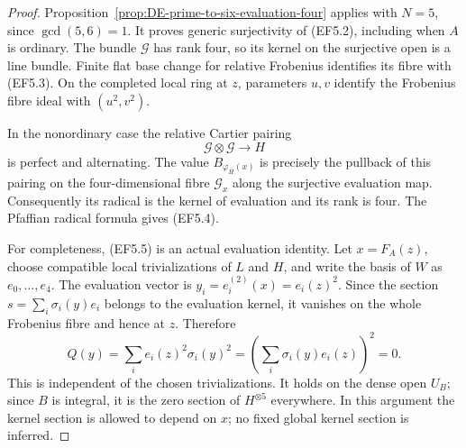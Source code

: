 \begin{proof}
Proposition~\ref{prop:DE-prime-to-six-evaluation-four} applies
with \(N=5\), since \(\gcd(5,6)=1\). It proves generic
surjectivity of (EF5.2), including when \(A\) is ordinary.
The bundle \(\mathcal G\) has rank four, so its kernel on the
surjective open is a line bundle. Finite flat base change for
relative Frobenius identifies its fibre with (EF5.3).
On the completed local ring at \(z\), parameters \(u,v\)
identify the Frobenius fibre ideal with \((u^2,v^2)\).

In the nonordinary case the relative Cartier pairing
\[
                  \mathcal G\otimes\mathcal G\longrightarrow H
 \tag{EF5.6}
\]
is perfect and alternating. The value \(B_{\varphi_H(x)}\)
is precisely the pullback of this pairing on the four-dimensional
fibre \(\mathcal G_x\) along the surjective evaluation map.
Consequently its radical is the kernel of evaluation and its
rank is four. The Pfaffian radical formula gives (EF5.4).

For completeness, (EF5.5) is an actual evaluation identity.
Let \(x=F_A(z)\), choose compatible local trivializations of
\(L\) and \(H\), and write the basis of \(W\) as
\(e_0,\ldots,e_4\). The evaluation vector is
\(y_i=e_i^{(2)}(x)=e_i(z)^2\). Since the section
\(s=\sum_i\sigma_i(y)e_i\) belongs to the evaluation kernel,
it vanishes on the whole Frobenius fibre and hence at \(z\).
Therefore
\[
 Q(y)=\sum_i e_i(z)^2\sigma_i(y)^2
       =\left(\sum_i\sigma_i(y)e_i(z)\right)^2=0.
 \tag{EF5.7}
\]
This is independent of the chosen trivializations. It holds on
the dense open \(U_B\); since \(B\) is integral, it is the
zero section of \(H^{\otimes5}\) everywhere. In this argument
the kernel section is allowed to depend on \(x\); no fixed
global kernel section is inferred.
\end{proof}

